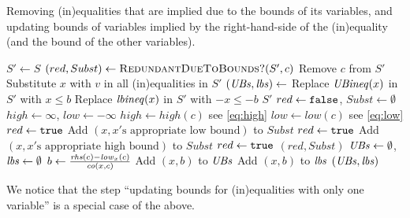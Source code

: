 \begin{algorithm}\caption{Removing (in)equalities that are implied due to the bounds of its variables, and updating bounds of variables implied by the right-hand-side of the (in)equality (and the bound of the other variables).}
\label{alg:bounds} 
\begin{algorithmic}
\State $S'\gets S$
	\State $(red, Subst) \gets \Call{RedundantDueToBounds?}{S', c}$
		\State Remove $c$ from $S'$
			\State Substitute $x$ with $v$ in all (in)equalities in $S'$
		\EndFor
	\Else
		\State $(\mathit{UBs}, \mathit{lbs})\gets$
			\State Replace $\mathit{UBineq}(x)$ in $S'$ with $x\leq b$		
		\EndFor
			\State Replace $\mathit{lbineq}(x)$ in $S'$ with $-x\leq -b$
		\EndFor
	\EndIf
\EndFor
\State\Return $S'$
\EndFunction
\State
{}
	\State $red \gets  \texttt{false}$, $Subst \gets \emptyset$
	\State $high\gets \infty$, $low\gets -\infty$ 
		\State $high \gets \mathit{high}(c)$ \Comment see \eqref{eq:high}
	\EndIf
		\State $low\gets \mathit{low}(c)$ \Comment see \eqref{eq:low}
	\EndIf
		\State $red \gets \texttt{true}$
			\State Add $(x, x'\text{s appropriate low bound})$ to $Subst$
		\EndFor
		\State $red \gets \texttt{true}$
			\State Add $(x, x'\text{s appropriate high bound})$ to $Subst$
		\EndFor
		\State $red \gets \texttt{true}$
	\EndIf
	\State\Return $(red, Subst)$
\EndFunction
\State
{}
	\State $\mathit{UBs}\gets \emptyset$, $\mathit{lbs}\gets\emptyset$
			\State $b\gets \frac{\mathit{rhs}(c)-\mathit{low}_x(c)}{\mathit{co}(x,c)}$
				\State Add $(x, b)$ to $\mathit{UBs}$
				\State Add $(x,b)$ to $\mathit{lbs}$
			\EndIf
		\EndIf
	\EndFor
	\State\Return $(\mathit{UBs},\mathit{lbs})$
\EndFunction
\end{algorithmic}
\end{algorithm}
We notice that the step ``updating bounds for (in)equalities with only one variable'' is a special case of the above.
%
